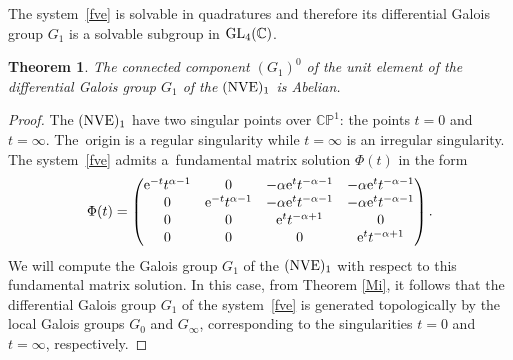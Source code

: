 \documentclass[10pt,a4paper]{amsart}
\numberwithin{equation}{section}
\newtheorem{Theorem}{Theorem}[section]
\begin{document}
 The system~\eqref{fve} is solvable in quadratures and therefore its differential Galois group $G_1$ is a solvable subgroup
 in ${\rm GL}_4(\mathbb{C})$.

 \begin{Theorem}%
 The connected component $(G_1)^0$ of the unit element of the differential Galois group $G_1$ of the $({\rm NVE})_1$ is Abelian.
 \end{Theorem}


 \begin{proof}

 The $({\rm NVE})_1$ have two singular points over $\mathbb{C}\mathbb{P}^1$: the points $t=0$ and $t=\infty$. The~origin is a regular singularity while $t=\infty$ is an irregular singularity.
 The system~\eqref{fve} admits a~fundamental matrix solution $\Phi(t)$ in the form
 \[
 \Phi(t)=\begin{pmatrix}
 {\rm e}^{-t} t^{\alpha-1} & 0 & -\alpha {\rm e}^t t^{-\alpha-1} & -\alpha {\rm e}^t t^{-\alpha-1}\\[0.1ex]
 0 & {\rm e}^{-t} t^{\alpha-1} & -\alpha {\rm e}^t t^{-\alpha-1} & -\alpha {\rm e}^t t^{-\alpha-1}\\[0.1ex]
 0 & 0 & {\rm e}^t t^{-\alpha+1} & 0\\[0.1ex]
 0 & 0 & 0 & {\rm e}^t t^{-\alpha+1}
 \end{pmatrix}.
 \]
 We will compute the Galois group $G_1$ of the $({\rm NVE})_1$ with respect to this fundamental matrix solution.
 In this case, from Theorem \ref{Mi}, it follows that
 the differential Galois group $G_1$ of the system~\eqref{fve} is generated topologically by the local Galois groups $G_0$ and $G_{\infty}$, corresponding to the singularities $t=0$ and $t=\infty$, respectively.


\end{proof}
\end{document}
